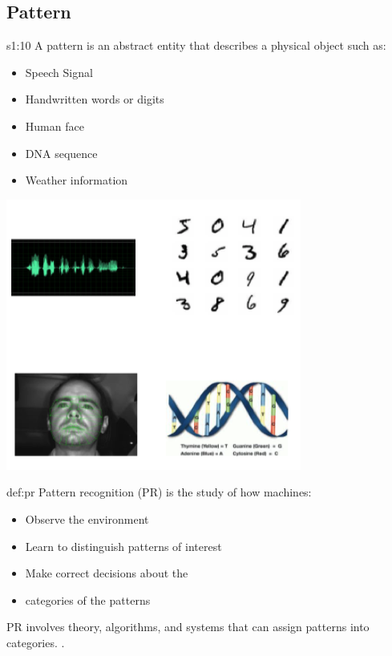 \documentclass{tron}
\begin{document}
\subsection{Pattern}
\begin{remark}{s1:10}
	A pattern is an abstract entity that describes a physical object such as:
	\begin{itemize}
		\item Speech Signal
		\item Handwritten words or digits
		\item Human face
		\item DNA sequence
		\item Weather information
	\end{itemize}
	\begin{center}
		\includegraphics[width=0.6\columnwidth]{Figs/Slide2/pattern.png}		
	\end{center}
\end{remark}
\begin{definition}{def:pr}
	Pattern recognition (PR) is the study of how machines:
	\begin{itemize}
		\item Observe the environment
		\item Learn to distinguish patterns of interest
		\item Make correct decisions about the
		\item categories of the patterns
	\end{itemize}
	\Gls{PR} involves theory, algorithms, and systems that can assign patterns into categories. .
\end{definition}
\end{document}
